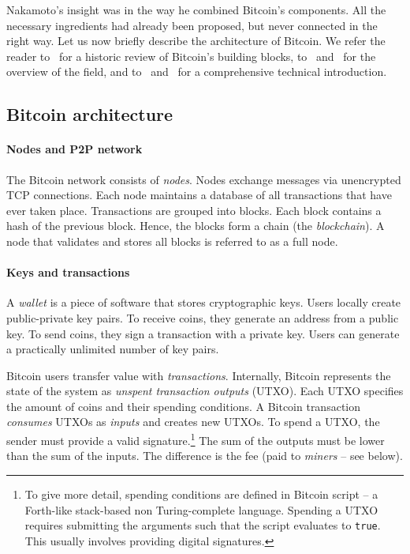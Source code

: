 Nakamoto's insight was in the way he combined Bitcoin's components.
All the necessary ingredients had already been proposed, but never connected in the right way.
Let us now briefly describe the architecture of Bitcoin.
We refer the reader to~\cite{Narayanan2017} for a historic review of Bitcoin's building blocks, to~\cite{Bonneau2015} and~\cite{Tschorsch2016} for the overview of the field, and to~\cite{Narayanan2016} and~\cite{Antonopoulos2014} for a comprehensive technical introduction.

\subsection{Bitcoin architecture}

\paragraph{Nodes and P2P network}

The Bitcoin network consists of \textit{nodes}.
Nodes exchange messages via unencrypted TCP connections.
Each node maintains a database of all transactions that have ever taken place.
Transactions are grouped into blocks.
Each block contains a hash of the previous block.
Hence, the blocks form a chain (the \textit{blockchain}).
A node that validates and stores all blocks is referred to as a full node.

\paragraph{Keys and transactions}

A \textit{wallet} is a piece of software that stores cryptographic keys.
Users locally create public-private key pairs.
To receive coins, they generate an address from a public key.
To send coins, they sign a transaction with a private key.
Users can generate a practically unlimited number of key pairs.

Bitcoin users transfer value with \textit{transactions}.
Internally, Bitcoin represents the state of the system as \textit{unspent transaction outputs} (UTXO).
Each UTXO specifies the amount of coins and their spending conditions.
A Bitcoin transaction \textit{consumes} UTXOs as \textit{inputs} and creates new UTXOs.
To spend a UTXO, the sender must provide a valid signature.\footnote{To give more detail, spending conditions are defined in Bitcoin script -- a Forth-like stack-based non Turing-complete language.
Spending a UTXO requires submitting the arguments such that the script evaluates to \texttt{true}.
This usually involves providing digital signatures.}
The sum of the outputs must be lower than the sum of the inputs.
The difference is the fee (paid to \textit{miners} -- see below).


